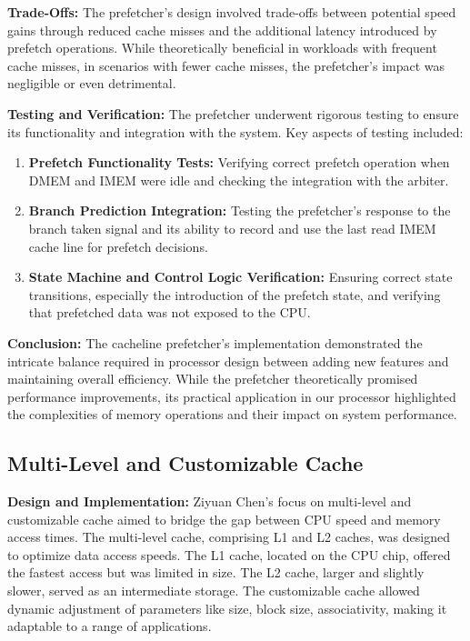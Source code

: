 \documentclass[12pt, a4paper]{article}
\begin{document}
    \textbf{Trade-Offs:}
    The prefetcher's design involved trade-offs between potential speed gains through reduced cache misses and the additional latency introduced by prefetch operations. While theoretically beneficial in workloads with frequent cache misses, in scenarios with fewer cache misses, the prefetcher's impact was negligible or even detrimental.
    
    \textbf{Testing and Verification:}
    The prefetcher underwent rigorous testing to ensure its functionality and integration with the system. Key aspects of testing included:
    \begin{enumerate}
        \item \textbf{Prefetch Functionality Tests:} Verifying correct prefetch operation when DMEM and IMEM were idle and checking the integration with the arbiter.
        \item \textbf{Branch Prediction Integration:} Testing the prefetcher's response to the branch taken signal and its ability to record and use the last read IMEM cache line for prefetch decisions.
        \item \textbf{State Machine and Control Logic Verification:} Ensuring correct state transitions, especially the introduction of the prefetch state, and verifying that prefetched data was not exposed to the CPU.
    \end{enumerate}
    
    \textbf{Conclusion:}
    The cacheline prefetcher's implementation demonstrated the intricate balance required in processor design between adding new features and maintaining overall efficiency. While the prefetcher theoretically promised performance improvements, its practical application in our processor highlighted the complexities of memory operations and their impact on system performance.


    \subsection{Multi-Level and Customizable Cache}

    
    \textbf{Design and Implementation:}
    Ziyuan Chen's focus on multi-level and customizable cache aimed to bridge the gap between CPU speed and memory access times. The multi-level cache, comprising L1 and L2 caches, was designed to optimize data access speeds. The L1 cache, located on the CPU chip, offered the fastest access but was limited in size. The L2 cache, larger and slightly slower, served as an intermediate storage. The customizable cache allowed dynamic adjustment of parameters like size, block size, associativity, making it adaptable to a range of applications.
    
\end{document}
